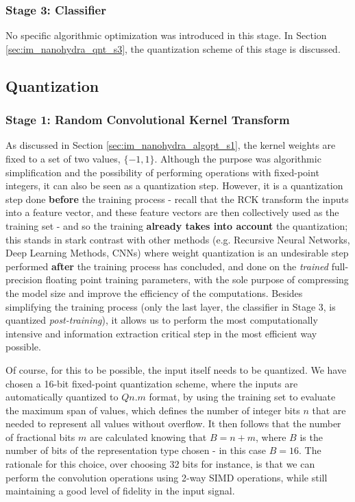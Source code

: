         \subsubsection{Stage 3: Classifier}\label{sec:im_nanohydra_algopt_s3}
        No specific algorithmic optimization was introduced in this stage. In Section \ref{sec:im_nanohydra_qnt_s3}, the quantization scheme of this stage is discussed.

    \subsection{Quantization}\label{sec:im_nanohydra_qnt}

        \subsubsection{Stage 1: Random Convolutional Kernel Transform}\label{sec:im_nanohydra_qnt_s1}

        As discussed in Section \ref{sec:im_nanohydra_algopt_s1}, the kernel weights are fixed to a set of two values, $\{-1,1\}$. Although the purpose was 
        algorithmic simplification and the possibility of performing operations with fixed-point integers, it can also be seen as a quantization step. 
        However, it is a quantization step done \textbf{before} the training process - recall that the RCK transform the inputs 
        into a feature vector, and these feature vectors are then collectively used as the training set - and so the training \textbf{already takes into account} the quantization; this
        stands in stark contrast with other methods (e.g. Recursive Neural Networks, Deep Learning Methods, CNNs) where weight quantization is an undesirable step performed \textbf{after} the training process has concluded, and 
        done on the \emph{trained} full-precision floating point training parameters, with the sole purpose of compressing the model size and improve the efficiency of the computations.
        Besides simplifying the training process (only the last layer, the classifier in Stage 3, is quantized \emph{post-training}), it allows us to perform the most computationally intensive and
        information extraction critical step in the most efficient way possible.

        Of course, for this to be possible, the input itself needs to be quantized. We have chosen a 16-bit fixed-point quantization scheme, where the inputs are automatically quantized to
        $Qn.m$ format, by using the training set to evaluate the maximum span of values, which defines the number of integer bits $n$
        that are needed to represent all values without overflow. It then follows that the number of fractional bits $m$ are calculated knowing that $B=n+m$, where $B$ is the number of bits 
        of the representation type chosen - in this case $B=16$. The rationale for this choice, over choosing 32 bits for instance, is that we can perform the convolution operations using 
        2-way SIMD operations, while still maintaining a good level of fidelity in the input signal.

